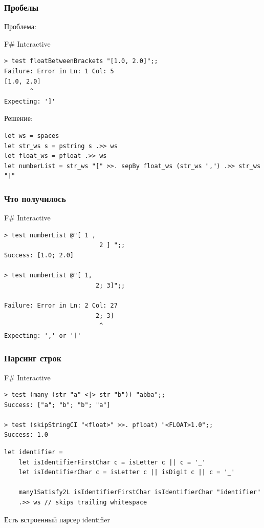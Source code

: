 \documentclass[xetex,mathserif,serif]{beamer}
\begin{document}
    \begin{frame}[fragile]
        \frametitle{Пробелы}
        Проблема:
        \begin{alertblock}{F\# Interactive}
            \begin{verbatim}
> test floatBetweenBrackets "[1.0, 2.0]";;
Failure: Error in Ln: 1 Col: 5
[1.0, 2.0]
       ^
Expecting: ']'
            \end{verbatim}
        \end{alertblock}
        Решение:
        \begin{verbatim}
let ws = spaces
let str_ws s = pstring s .>> ws
let float_ws = pfloat .>> ws
let numberList = str_ws "[" >>. sepBy float_ws (str_ws ",") .>> str_ws "]"
        \end{verbatim}

    \end{frame}

    \begin{frame}[fragile]
        \frametitle{Что получилось}
        \begin{alertblock}{F\# Interactive}
            \begin{verbatim}
> test numberList @"[ 1 ,
                          2 ] ";;
Success: [1.0; 2.0]

> test numberList @"[ 1,
                         2; 3]";;

Failure: Error in Ln: 2 Col: 27
                         2; 3]
                          ^
Expecting: ',' or ']'
            \end{verbatim}
        \end{alertblock}
    \end{frame}

    \begin{frame}[fragile]
        \frametitle{Парсинг строк}
        \begin{alertblock}{F\# Interactive}
            \begin{verbatim}
> test (many (str "a" <|> str "b")) "abba";;
Success: ["a"; "b"; "b"; "a"]

> test (skipStringCI "<float>" >>. pfloat) "<FLOAT>1.0";;
Success: 1.0
            \end{verbatim}
        \end{alertblock}
        \begin{verbatim}
let identifier =
    let isIdentifierFirstChar c = isLetter c || c = '_'
    let isIdentifierChar c = isLetter c || isDigit c || c = '_'

    many1Satisfy2L isIdentifierFirstChar isIdentifierChar "identifier"
    .>> ws // skips trailing whitespace
        \end{verbatim}
        Есть встроенный парсер identifier
    \end{frame}
\end{document}
